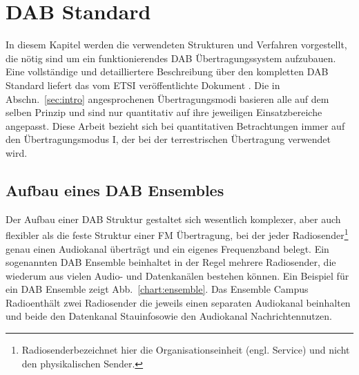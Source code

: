 \chapter{DAB Standard}
\label{sec:standard}
In diesem Kapitel werden die verwendeten Strukturen und Verfahren vorgestellt, die nötig sind um ein funktionierendes DAB Übertragungssystem aufzubauen. Eine vollständige und detailliertere Beschreibung über den kompletten DAB Standard liefert das vom \ac{ETSI} veröffentlichte Dokument \cite{etsi:dab_main}. Die in Abschn.~\ref{sec:intro} angesprochenen Übertragungsmodi basieren alle auf dem selben Prinzip und sind nur quantitativ auf ihre jeweiligen Einsatzbereiche angepasst. Diese Arbeit bezieht sich bei quantitativen Betrachtungen immer auf den Übertragungsmodus I, der bei der terrestrischen Übertragung verwendet wird.

\section{Aufbau eines DAB Ensembles}
Der Aufbau einer DAB Struktur gestaltet sich wesentlich komplexer, aber auch flexibler als die feste Struktur einer FM Übertragung, bei der jeder Radiosender\footnote{\dq Radiosender\dq bezeichnet hier die Organisationseinheit (engl. \dq Service\dq) und nicht den physikalischen Sender.} genau einen Audiokanal überträgt und ein eigenes Frequenzband belegt. Ein sogenannten DAB Ensemble beinhaltet in der Regel mehrere Radiosender, die wiederum aus vielen Audio- und Datenkanälen bestehen können. Ein Beispiel für ein DAB Ensemble zeigt Abb.~\ref{chart:ensemble}. Das Ensemble \dq Campus Radio\dq enthält zwei Radiosender die jeweils einen separaten Audiokanal beinhalten und beide den Datenkanal \dq Stauinfo\dq sowie den Audiokanal \dq Nachrichten\dq nutzen.\\


